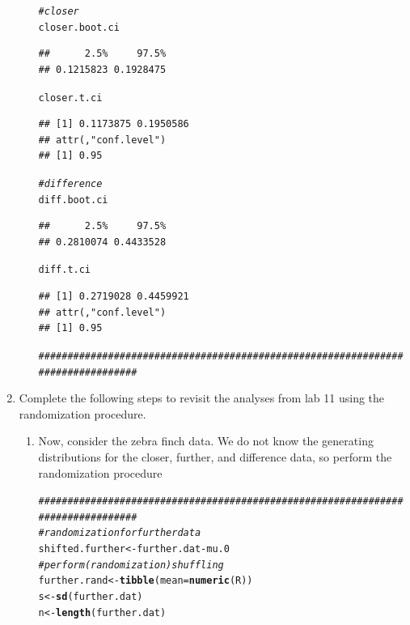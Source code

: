 \documentclass{article}\usepackage[]{graphicx}\usepackage[]{xcolor}
\makeatletter
\newcommand{\hlcom}[1]{\textcolor[rgb]{0.678,0.584,0.686}{\textit{#1}}}%
\newcommand{\hlopt}[1]{\textcolor[rgb]{0,0,0}{#1}}%
\newcommand{\hldef}[1]{\textcolor[rgb]{0.345,0.345,0.345}{#1}}%
\newcommand{\hlkwb}[1]{\textcolor[rgb]{0.69,0.353,0.396}{#1}}%
\newcommand{\hlkwc}[1]{\textcolor[rgb]{0.333,0.667,0.333}{#1}}%
\newcommand{\hlkwd}[1]{\textcolor[rgb]{0.737,0.353,0.396}{\textbf{#1}}}%
\newenvironment{kframe}{%
 \def\at@end@of@kframe{}%
 \ifinner\ifhmode%
  \def\at@end@of@kframe{\end{minipage}}%
  \begin{minipage}{\columnwidth}%
 \fi\fi%
 \def\FrameCommand##1{\hskip\@totalleftmargin \hskip-\fboxsep
 \colorbox{shadecolor}{##1}\hskip-\fboxsep
     \hskip-\linewidth \hskip-\@totalleftmargin \hskip\columnwidth}%
 \MakeFramed {\advance\hsize-\width
   \@totalleftmargin\z@ \linewidth\hsize
   \@setminipage}}%
 {\par\unskip\endMakeFramed%
 \at@end@of@kframe}
\newenvironment{knitrout}{}{} %
\makeatother
\begin{document}
\begin{enumerate}
\begin{enumerate}
\begin{knitrout}
\begin{kframe}
\begin{alltt}
\hlcom{# closer}
\hldef{closer.boot.ci}
\end{alltt}
\begin{verbatim}
##      2.5%     97.5% 
## 0.1215823 0.1928475
\end{verbatim}
\begin{alltt}
\hldef{closer.t.ci}
\end{alltt}
\begin{verbatim}
## [1] 0.1173875 0.1950586
## attr(,"conf.level")
## [1] 0.95
\end{verbatim}
\begin{alltt}
\hlcom{# difference}
\hldef{diff.boot.ci}
\end{alltt}
\begin{verbatim}
##      2.5%     97.5% 
## 0.2810074 0.4433528
\end{verbatim}
\begin{alltt}
\hldef{diff.t.ci}
\end{alltt}
\begin{verbatim}
## [1] 0.2719028 0.4459921
## attr(,"conf.level")
## [1] 0.95
\end{verbatim}
\begin{alltt}
\hlcom{################################################################################}
\end{alltt}
\end{kframe}
\end{knitrout}
\end{enumerate}
\item Complete the following steps to revisit the analyses from lab 11 using the
randomization procedure.
\begin{enumerate}
\item Now, consider the zebra finch data. We do not know the generating distributions
for the closer, further, and difference data, so perform the randomization procedure
\begin{knitrout}\scriptsize
{}\color{fgcolor}\begin{kframe}
\begin{alltt}
\hlcom{################################################################################}
\hlcom{# randomization for further data}
\hldef{shifted.further} \hlkwb{<-} \hldef{further.dat} \hlopt{-} \hldef{mu.0}
\hlcom{# perform (randomization) shuffling}
\hldef{further.rand} \hlkwb{<-} \hlkwd{tibble}\hldef{(}\hlkwc{mean} \hldef{=} \hlkwd{numeric}\hldef{(R))}
\hldef{s} \hlkwb{<-} \hlkwd{sd}\hldef{(further.dat)}
\hldef{n} \hlkwb{<-} \hlkwd{length}\hldef{(further.dat)}


\end{alltt}
\end{kframe}
\end{knitrout}
\end{enumerate}
\end{enumerate}
\end{document}
